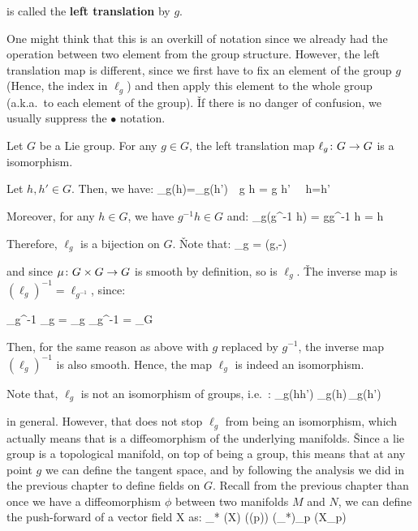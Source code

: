 is called the \textbf{left translation} by $g$.
\ed

One might think that this is an overkill of notation since we already had the operation between two element from the
group structure. However, the left translation map is different, since we first have to fix an element of the group
$g$ (Hence, the index in $\ell_g$) and then apply this element to the whole group (a.k.a.\ to each element of the
group). \v

If there is no danger of confusion, we usually suppress the $\bullet$ notation.

\bt[]
Let $G$ be a Lie group. For any $g\in G$, the left translation map $\ell_g\colon G \to G$ is a isomorphism.
\et

\bq
Let $h,h'\in G$. Then, we have:
\bse
\ell_g(h)=\ell_g(h')\ \Leftrightarrow\ g h = g h' \ \Leftrightarrow\ h=h'
\ese

Moreover, for any $h\in G$, we have $g^{-1} h\in G$ and:
\bse
\ell_g(g^{-1} h) = gg^{-1} h = h
\ese

Therefore, $\ell_g$ is a bijection on $G$. \v

Note that:
\bse
\ell_g = \mu(g,-)
\ese

and since $\mu\colon G\times G \to G$ is smooth by definition, so is $\ell_g$. \v

The inverse map is $(\ell_g)^{-1}=\ell_{g^{-1}}$, since:

\bse
\ell_{g^{-1}} \circ \ell_{g} = \ell_{g} \circ \ell_{g^{-1}} = \id_G
\ese

Then, for the same reason as above with $g$ replaced by $g^{-1}$, the inverse map $(\ell_g)^{-1}$ is also smooth.
Hence, the map $\ell_g$ is indeed an isomorphism.
\eq

Note that, $\ell_g$ is not an isomorphism of groups, i.e.\ :
\bse
\ell_g(hh') \neq \ell_g(h)\,\ell_g(h')
\ese

in general. However, that does not stop $\ell_g$ from being an isomorphism, which actually means that is a
diffeomorphism of the underlying manifolds. \v

Since a lie group is a topological manifold, on top of being a group, this means that at any point $g$ we can define
the tangent space, and by following the analysis we did in the previous chapter to define fields on $G$. Recall from
the previous chapter than once we have a diffeomorphism $\phi$ between two manifolds $M$ and $N$, we can define the
push-forward of a vector field X as:
\bse
\phi_* (X) (\phi(p)) \coloneqq (\phi_*)_p (X_p)
\ese

